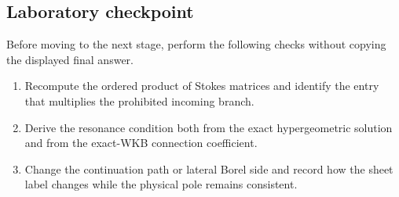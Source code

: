 \subsection*{Laboratory checkpoint}
Before moving to the next stage, perform the following checks without copying
the displayed final answer.
\begin{enumerate}
  \item Recompute the ordered product of Stokes matrices and identify the entry that multiplies the prohibited incoming branch.
  \item Derive the resonance condition both from the exact hypergeometric solution and from the exact-WKB connection coefficient.
  \item Change the continuation path or lateral Borel side and record how the sheet label changes while the physical pole remains consistent.
\end{enumerate}
